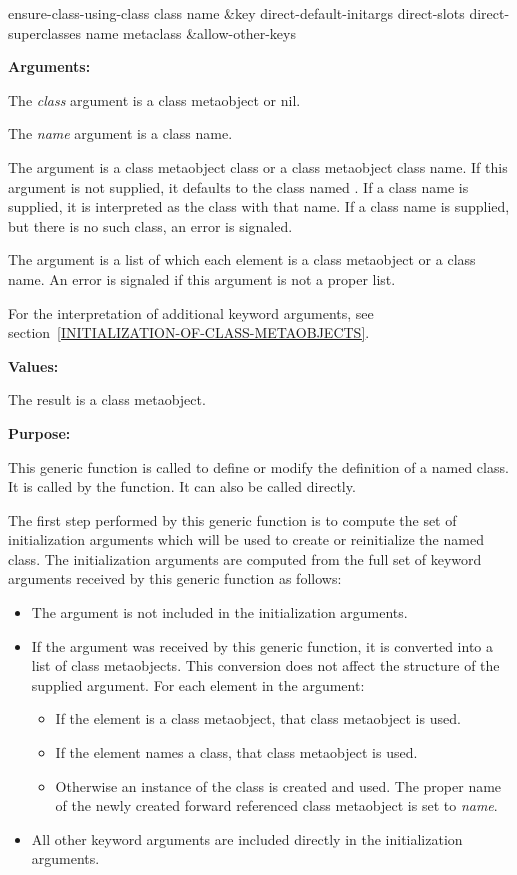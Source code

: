 \begin{defun}
ensure-class-using-class class name &key direct-default-initargs direct-slots
  direct-superclasses name metaclass &allow-other-keys

\textbf{Arguments:}

The \emph{class} argument is a class metaobject or nil.

The \emph{name} argument is a class name.

The  argument is a class metaobject class or a class metaobject
class name. If this argument is not supplied, it defaults to the class named
. If a class name is supplied, it is interpreted as the
class with that name. If a class name is supplied, but there is no such class,
an error is signaled.

The  argument is a list of which each element is a class
metaobject or a class name. An error is signaled if this argument is not a
proper list.

For the interpretation of additional keyword arguments, see
section~\ref{INITIALIZATION-OF-CLASS-METAOBJECTS}.

\textbf{Values:}

The result is a class metaobject.

\textbf{Purpose:}

This generic function is called to define or modify the definition of a named
class. It is called by the  function. It can also be called
directly.

The first step performed by this generic function is to compute the set of
initialization arguments which will be used to create or reinitialize the named
class. The initialization arguments are computed from the full set of keyword
arguments received by this generic function as follows:

\begin{itemize}
\item 
  The  argument is not included in the initialization arguments.

\item 
  If the  argument was received by this generic function,
  it is converted into a list of class metaobjects. This conversion does not
  affect the structure of the supplied  argument. For each
  element in the  argument: 
  \begin{itemize}
  \item 
    If the element is a class metaobject, that class metaobject is used.
  \item 
    If the element names a class, that class metaobject is used.
  \item 
    Otherwise an instance of the class  is created
    and used. The proper name of the newly created forward referenced class
    metaobject is set to \emph{name}. 
  \end{itemize}
\item 
  All other keyword arguments are included directly in the initialization
  arguments.
\end{itemize}


\end{defun}
